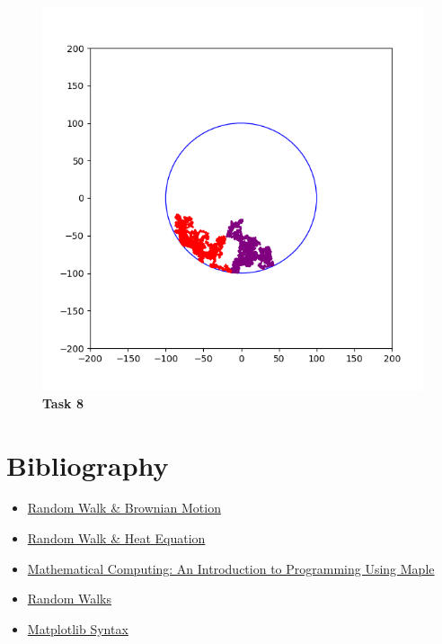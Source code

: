 \documentclass{article}
\begin{document}
    \begin{figure}[H]
        \includegraphics[width=15cm]{Graphs/task8.png}
        \centering
        \caption{\textbf{Task 8}}
    \end{figure}
    
    \section*{Bibliography}
    \begin{itemize}
        \item \href{http://web.mit.edu8.334/www/grades/projects/projects17/OscarMickelin/brownian.html}{Random Walk \& Brownian Motion}
        \item \href{https://www.math.uchicago.edu/~lawler/reu.pdf}{Random Walk \& Heat Equation}
        \item \href{https://books.google.com.pk/books?id=U2CrDY1MH5kC&pg=PA374&lpg=PA374&dq=how+to+reflect+a+point+from+the+boundary+of+circle+in+random+walk&source=bl&ots=_rt0N7oorr&sig=ACfU3U1LqlLgMpwvczXGymF0JxRteDJoRw&hl=en&sa=X&ved=2ahUKEwjP0PnOn47qAhUMqxoKHRbkCfwQ6AEwC3oECAkQAQ#v=onepage&q=how%20to%20reflect%20a%20point%20from%20the%20boundary%20of%20circle%20in%20random%20walk&f=false}{Mathematical Computing: An Introduction to Programming Using Maple}
        \item \href{http://physics.gu.se/~frtbm/joomla/media/mydocs/LennartSjogren/kap2.pdf}{Random Walks}
        \item \href{https://matplotlib.org/tutorials/introductory/pyplot.html}{Matplotlib Syntax}
    \end{itemize}
\end{document}
